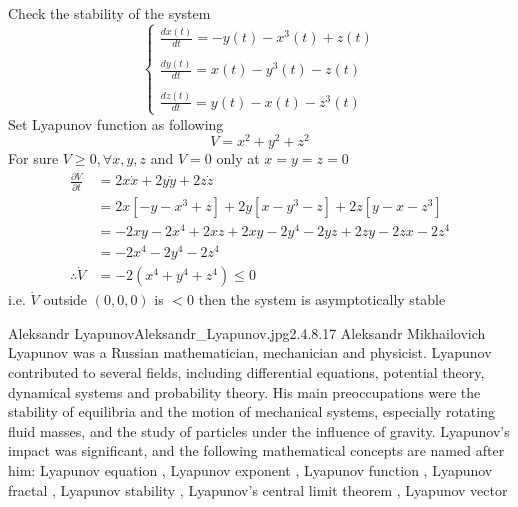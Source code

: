\documentclass[]{article}
\begin{document}
\begin{example}
    Check the stability of the system
    \begin{equation*}
        \begin{cases}
            \displaystyle \frac{dx(t)}{dt} = -y(t) - x^3(t) + z(t)
            \\\\
            \displaystyle \frac{dy(t)}{dt} = x(t) - y^3(t) - z(t)
            \\\\
            \displaystyle \frac{dz(t)}{dt} = y(t) - x(t) - z^3(t)
        \end{cases}
    \end{equation*}
    Set Lyapunov function as following
    \[
        V = x^2 + y^2 + z^2
    \]
    For sure $V \geq 0 , \forall x,y,z$ and $V = 0$ only at $x=y=z=0 $
    \begin{align*}
        \frac{\partial V}{\partial t} & = 2x \dot{x} +2y\dot{y} +2z \dot{z}
        \\
                                      & = 2x[-y - x^3 + z] +2y[x - y^3 - z] +2z[y - x - z^3]
        \\
                                      & =-2xy -2x^4 + 2xz +2xy -2y^4 -2yz +2zy -2zx -2z^4
        \\
                                      & = -2x^4 -2y^4 -2z^4
        \\
        \therefore \dot{V}            & =  -2(x^4 + y^4 + z^4) \leq 0
    \end{align*}
    i.e. $\dot{V}$ outside $(0,0,0)$ is $<0$ then the system is asymptotically stable
\end{example}

\begin{enrichment}{Aleksandr Lyapunov}{Aleksandr_Lyapunov.jpg}{2.4}{.8}{.17}
    Aleksandr Mikhailovich Lyapunov was a Russian mathematician, mechanician and physicist. Lyapunov contributed to several fields, including differential equations, potential theory, dynamical systems and probability theory. His main preoccupations were the stability of equilibria and the motion of mechanical systems, especially rotating fluid masses, and the study of particles under the influence of gravity.
    Lyapunov's impact was significant, and the following mathematical concepts are named after him:
    Lyapunov equation ,
    Lyapunov exponent ,
    Lyapunov function ,
    Lyapunov fractal ,
    Lyapunov stability ,
    Lyapunov's central limit theorem ,
    Lyapunov vector
\end{enrichment}
\end{document}

